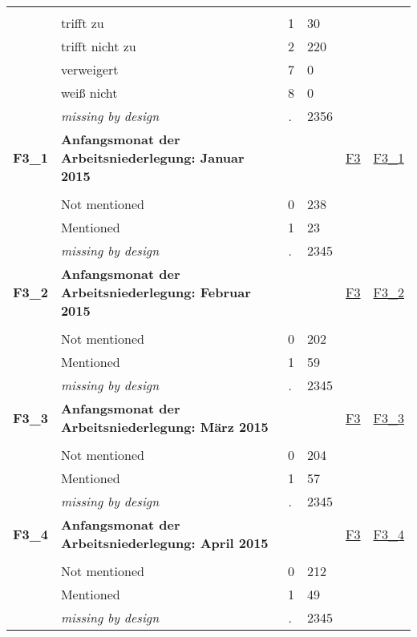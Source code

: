 \begin{longtable}{| L{2.45cm} | L{6cm} | C{1.5cm} | R{1cm} | C{2.25cm} | C{2.25cm} |}
   &  &  &  &  &  \\ 
   & trifft zu & 1 & 30 &  &  \\ 
   & trifft nicht zu & 2 & 220 &  &  \\ 
   & verweigert & 7 & 0 &  &  \\ 
   & weiß nicht & 8 & 0 &  &  \\ 
   & \textit{missing by design} & \textit{.} & 2356 &  &  \\ 
   \midrule
\textbf{F3\_1}\label{var:F3:1} & \textbf{Anfangsmonat der Arbeitsniederlegung: Januar 2015} &  &  & \hyperref[F3]{F3} & \hyperref[var:suf:F3:1]{F3\_1} \\ 
   &  &  &  &  &  \\ 
   & Not mentioned & 0 & 238 &  &  \\ 
   & Mentioned & 1 & 23 &  &  \\ 
   & \textit{missing by design} & \textit{.} & 2345 &  &  \\ 
   \midrule
\textbf{F3\_2}\label{var:F3:2} & \textbf{Anfangsmonat der Arbeitsniederlegung: Februar 2015} &  &  & \hyperref[F3]{F3} & \hyperref[var:suf:F3:2]{F3\_2} \\ 
   &  &  &  &  &  \\ 
   & Not mentioned & 0 & 202 &  &  \\ 
   & Mentioned & 1 & 59 &  &  \\ 
   & \textit{missing by design} & \textit{.} & 2345 &  &  \\ 
   \midrule
\textbf{F3\_3}\label{var:F3:3} & \textbf{Anfangsmonat der Arbeitsniederlegung: März 2015} &  &  & \hyperref[F3]{F3} & \hyperref[var:suf:F3:3]{F3\_3} \\ 
   &  &  &  &  &  \\ 
   & Not mentioned & 0 & 204 &  &  \\ 
   & Mentioned & 1 & 57 &  &  \\ 
   & \textit{missing by design} & \textit{.} & 2345 &  &  \\ 
   \midrule
\textbf{F3\_4}\label{var:F3:4} & \textbf{Anfangsmonat der Arbeitsniederlegung: April 2015} &  &  & \hyperref[F3]{F3} & \hyperref[var:suf:F3:4]{F3\_4} \\ 
   &  &  &  &  &  \\ 
   & Not mentioned & 0 & 212 &  &  \\ 
   & Mentioned & 1 & 49 &  &  \\ 
   & \textit{missing by design} & \textit{.} & 2345 &  &  \\ 

\end{longtable}
